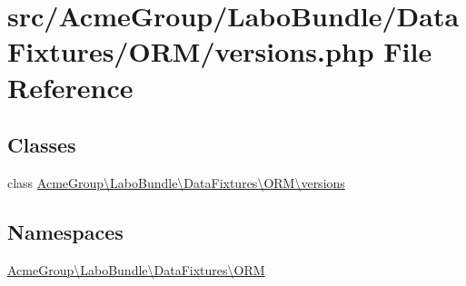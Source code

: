 \hypertarget{versions_8php}{\section{src/\+Acme\+Group/\+Labo\+Bundle/\+Data\+Fixtures/\+O\+R\+M/versions.php File Reference}
\label{versions_8php}
}
\subsection*{Classes}
\begin{DoxyCompactItemize}
\item 
class \hyperlink{class_acme_group_1_1_labo_bundle_1_1_data_fixtures_1_1_o_r_m_1_1versions}{Acme\+Group\textbackslash{}\+Labo\+Bundle\textbackslash{}\+Data\+Fixtures\textbackslash{}\+O\+R\+M\textbackslash{}versions}
\end{DoxyCompactItemize}
\subsection*{Namespaces}
\begin{DoxyCompactItemize}
\item 
 \hyperlink{namespace_acme_group_1_1_labo_bundle_1_1_data_fixtures_1_1_o_r_m}{Acme\+Group\textbackslash{}\+Labo\+Bundle\textbackslash{}\+Data\+Fixtures\textbackslash{}\+O\+R\+M}
\end{DoxyCompactItemize}
